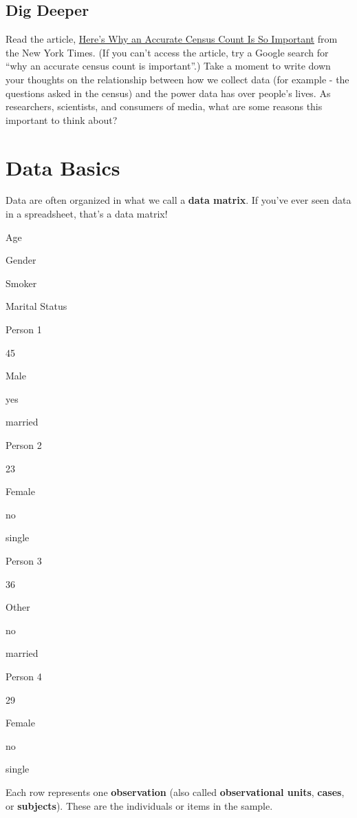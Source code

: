\documentclass[
]{book}
\begin{document}
\hypertarget{dig-deeper}{%
\subsection*{Dig Deeper}\label{dig-deeper}}

Read the article, \href{https://www.nytimes.com/2018/03/27/us/politics/census-citizenship-question.html}{Here's Why an Accurate Census Count Is So Important} from the New York Times. (If you can't access the article, try a Google search for ``why an accurate census count is important''.) Take a moment to write down your thoughts on the relationship between how we collect data (for example - the questions asked in the census) and the power data has over people's lives. As researchers, scientists, and consumers of media, what are some reasons this important to think about?

\hypertarget{data-basics}{%
\section{Data Basics}\label{data-basics}}

Data are often organized in what we call a \textbf{data matrix}. If you've ever seen data in a spreadsheet, that's a data matrix!

Age

Gender

Smoker

Marital Status

Person 1

45

Male

yes

married

Person 2

23

Female

no

single

Person 3

36

Other

no

married

Person 4

29

Female

no

single

Each row represents one \textbf{observation} (also called \textbf{observational units}, \textbf{cases}, or \textbf{subjects}). These are the individuals or items in the sample.
\end{document}

